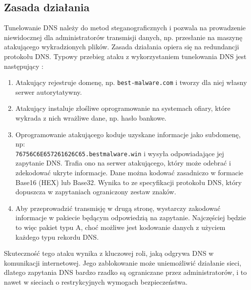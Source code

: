 \documentclass{eiti-raport}
\begin{document}
\subsection{Zasada działania} \label{sec:tunelowanie}
Tunelowanie DNS należy do metod steganograficznych i pozwala na prowadzenie niewidocznej dla administratorów transmisji danych, np. przesłanie na maszynę atakującego wykradzionych plików. Zasada działania opiera się na redundancji protokołu DNS. Typowy przebieg ataku z wykorzystaniem tunelowania DNS jest następujący \cite{infosec}:
\begin{enumerate}
	\item Atakujący rejestruje domenę, np. \texttt{best-malware.com} i tworzy dla niej własny serwer autorytatywny. 
	\item Atakujący instaluje złośliwe oprogramowanie na systemach ofiary, które wykrada z nich wrażliwe dane, np. hasło bankowe. 
	\item Oprogramowanie atakującego koduje uzyskane informacje jako subdomenę, np: \\  \texttt{76756C6E657261626C65.bestmalware.win} i wysyła odpowiadające jej zapytanie DNS. Trafia ono na serwer atakującego, który może odebrać i zdekodować ukryte informacje. Dane można kodować zasadniczo w formacie Base16 (HEX) lub Base32. Wynika to ze specyfikacji protokołu DNS, który dopuszcza w zapytaniach ograniczony zestaw znaków. 
	\item Aby przeprowadzić transmisję w drugą stronę, wystarczy zakodować informacje w pakiecie będącym odpowiedzią na zapytanie. Najczęściej będzie to więc pakiet typu A, choć możliwe jest kodowanie danych z użyciem każdego typu rekordu DNS. 
\end{enumerate}
Skuteczność tego ataku wynika z kluczowej roli, jaką odgrywa DNS w komunikacji internetowej. Jego zablokowanie może uniemożliwić działanie sieci, dlatego zapytania DNS bardzo rzadko są ograniczane przez administratorów, i to nawet w sieciach o restrykcyjnych wymogach bezpieczeństwa. 
\end{document}
